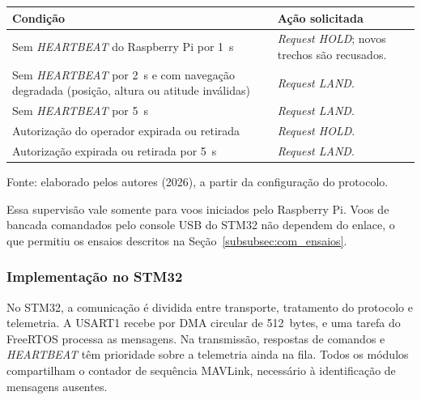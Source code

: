 \begin{quadro}[H]
    \centering
    \caption{Ações do STM32 diante da perda do enlace ou da autorização.}
    \label{qua:dronelink_failsafe}
    \small
    \renewcommand{\arraystretch}{1.25}
    \begin{tabular}{|>{\raggedright\arraybackslash}p{7.6cm}|>{\raggedright\arraybackslash}p{6.2cm}|}
        \hline
        \textbf{Condição} & \textbf{Ação solicitada} \\
        \hline
        Sem \textit{HEARTBEAT} do Raspberry Pi por 1~s &
        \textit{Request HOLD}; novos trechos são recusados. \\
        \hline
        Sem \textit{HEARTBEAT} por 2~s e com navegação degradada
        (posição, altura ou atitude inválidas) &
        \textit{Request LAND}. \\
        \hline
        Sem \textit{HEARTBEAT} por 5~s &
        \textit{Request LAND}. \\
        \hline
        Autorização do operador expirada ou retirada &
        \textit{Request HOLD}. \\
        \hline
        Autorização expirada ou retirada por 5~s &
        \textit{Request LAND}. \\
        \hline
    \end{tabular}
    \par\vspace{0.2cm}
    \footnotesize Fonte: elaborado pelos autores (2026), a partir da configuração do protocolo.
\end{quadro}

Essa supervisão vale somente para voos iniciados pelo Raspberry Pi. Voos de bancada comandados pelo console USB do STM32 não dependem do enlace, o que permitiu os ensaios descritos na Seção~\ref{subsubsec:com_ensaios}.

\subsubsection{Implementação no STM32}\label{subsubsec:com_firmware}

No STM32, a comunicação é dividida entre transporte, tratamento do protocolo e telemetria. A USART1 recebe por DMA circular de 512~bytes, e uma tarefa do FreeRTOS processa as mensagens. Na transmissão, respostas de comandos e \textit{HEARTBEAT} têm prioridade sobre a telemetria ainda na fila. Todos os módulos compartilham o contador de sequência MAVLink, necessário à identificação de mensagens ausentes.


